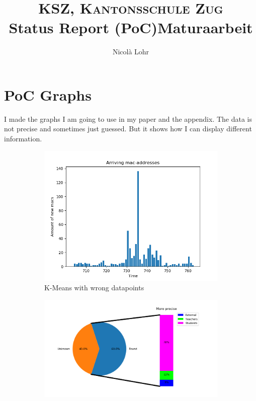 \documentclass[paper=a4, fontsize=11pt]{article}
\title{\normalfont \normalsize \textsc{KSZ, Kantonsschule Zug} \\ [25pt]
\huge Status Report (PoC)\linebreak\linebreak \large Maturaarbeit\\ 
}
\author{Nicolà Lohr}
\begin{document}
\maketitle
\newpage

\section{PoC Graphs}
I made the graphs I am going to use in my paper and the appendix. The data is not precise and sometimes just guessed. But it shows how I can display different information.

\begin{figure}[H]
  \centering
  \begin{subfigure}[b]{0.3\linewidth}
    \includegraphics[width=\linewidth]{fridaymorning7-8v2.png}
     \caption{K-Means with wrong datapoints}
	\label{fig:basicbargraph1}
  \end{subfigure}
  \begin{subfigure}[b]{0.3\linewidth}
    \includegraphics[width=\linewidth]{piecharwith_usernames.png}

\end{subfigure}
\end{figure}
\end{document}
